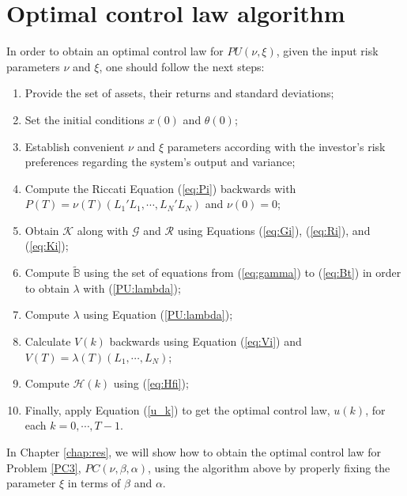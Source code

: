 \section{Optimal control law algorithm} \label{remark:uk}
	In order to obtain an optimal control law for $PU(\nu,\xi)$, given the input risk 
	parameters $\nu$ and $\xi$, one should follow the next steps: 
	\begin{enumerate}
		\item Provide the set of assets, their returns and standard deviations;
		
		\item Set the initial conditions $x(0)$ and $\theta(0)$;
		
		\item Establish convenient $\nu$ and $\xi$ parameters according with the investor's risk preferences regarding the system's output and variance;
		
		\item Compute the Riccati Equation (\ref{eq:Pi}) backwards with 
				$P(T) = \nu(T)(L_1'L_1, \cdots, L_N'L_N)$ and $\nu(0)=0$;
	
		\item Obtain $\mathcal{K}$ along with $\mathcal{G}$ and $\mathcal{R}$ using 
				Equations (\ref{eq:Gi}), (\ref{eq:Ri}), and (\ref{eq:Ki});
	
		\item Compute $\tilde{\mathbb{B}}$ using the set of equations from 
				(\ref{eq:gamma}) to (\ref{eq:Bt}) in order to obtain $\lambda$ with 
				(\ref{PU:lambda});
		\item Compute $\lambda$ using Equation (\ref{PU:lambda});

		\item Calculate $V(k)$ backwards using Equation (\ref{eq:Vi}) 
			and $V(T) = \lambda(T)(L_1, \cdots, L_N)$;
	
		\item Compute $\mathcal{H}(k)$ using (\ref{eq:Hfi});
			
		\item Finally, apply Equation (\ref{u_k}) to get the optimal control law, $u(k)$, for each $k = 0, \cdots, T-1$. 
	\end{enumerate}
	
In Chapter \ref{chap:res}, we will show how to obtain the optimal control law for Problem \ref{PC3}, $PC(\nu,\beta,\alpha)$, using the algorithm above by properly fixing the parameter $\xi$ in terms of $\beta$ and $\alpha$.


%
